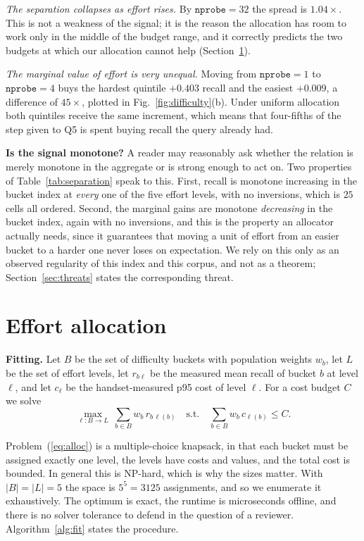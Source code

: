 \documentclass[journal]{IEEEtran}
\newcommand{\nprobe}{\texttt{nprobe}}
\begin{document}
\emph{The separation collapses as effort rises.} By $\nprobe = 32$ the
spread is $1.04\times$. This is not a weakness of the signal; it is the
reason the allocation has room to work only in the middle of the budget
range, and it correctly predicts the two budgets at which our allocation
cannot help (Section~\ref{sec:alloc}).

\emph{The marginal value of effort is very unequal.} Moving from $\nprobe =
1$ to $\nprobe = 4$ buys the hardest quintile $+0.403$ recall and the
easiest $+0.009$, a difference of $45\times$, plotted in
Fig.~\ref{fig:difficulty}(b). Under uniform allocation both quintiles
receive the same increment, which means that four-fifths of the step given
to Q5 is spent buying recall the query already had.

\textbf{Is the signal monotone?} A reader may reasonably ask whether the
relation is merely monotone in the aggregate or is strong enough to act on.
Two properties of Table~\ref{tab:separation} speak to this. First, recall
is monotone increasing in the bucket index at \emph{every} one of the five
effort levels, with no inversions, which is $25$ cells all ordered. Second,
the marginal gains are monotone \emph{decreasing} in the bucket index,
again with no inversions, and this is the property an allocator actually
needs, since it guarantees that moving a unit of effort from an easier
bucket to a harder one never loses on expectation. We rely on this only as
an observed regularity of this index and this corpus, and not as a theorem;
Section~\ref{sec:threats} states the corresponding threat.

\section{Effort allocation}
\label{sec:alloc}

\textbf{Fitting.} Let $B$ be the set of difficulty buckets with population
weights $w_b$, let $L$ be the set of effort levels, let $r_{b\ell}$ be the
measured mean recall of bucket $b$ at level $\ell$, and let $c_\ell$ be the
handset-measured p95 cost of level $\ell$. For a cost budget $C$ we solve
\begin{equation}
\max_{\ell : B \to L}\ \sum_{b \in B} w_b\, r_{b\,\ell(b)}
\quad \text{s.t.} \quad
\sum_{b \in B} w_b\, c_{\ell(b)} \le C .
\label{eq:alloc}
\end{equation}

Problem~(\ref{eq:alloc}) is a multiple-choice knapsack, in that each bucket
must be assigned exactly one level, the levels have costs and values, and
the total cost is bounded. In general this is NP-hard, which is why the
sizes matter. With $|B| = |L| = 5$ the space is $5^5 = 3125$ assignments,
and so we enumerate it exhaustively. The optimum is exact, the runtime is
microseconds offline, and there is no solver tolerance to defend in the
question of a reviewer. Algorithm~\ref{alg:fit} states the procedure.
\end{document}
